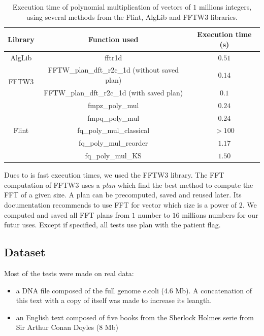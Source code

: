 \documentclass[preprint,12pt]{elsarticle}
\begin{document}
\begin{table}[h]
\label{tempsFFT}
\begin{tabular}{|c|c|c|}
\hline
Library 				& Function used 							& Execution time (s) \\ \hline
AlgLib 					& fftr1d 									& $0.51$ \\ \hline
\multirow{2}{*}{FFTW3} 	& FFTW\_plan\_dft\_r2c\_1d (without saved plan) & $0.14$ \\
						& FFTW\_plan\_dft\_r2c\_1d (with saved plan) 	& $0.1$ \\ \hline
\multirow{5}{*}{Flint} 	& fmpz\_poly\_mul 							& $0.24$ \\
						& fmpq\_poly\_mul 							& $0.24$ \\
						& fq\_poly\_mul\_classical 					& $> 100$ \\
						& fq\_poly\_mul\_reorder 						& $1.17$ \\
						& fq\_poly\_mul\_KS 							& $1.50$ \\ \hline
\end{tabular}
\caption{Execution time of polynomial multiplication of vectors of $1$ millions integers,
using several methods from the Flint, AlgLib and FFTW3 libraries.
}
\end{table}

Dues to is fast execution times, we used the FFTW3 library.
The FFT computation of FFTW3 uses a \textit{plan} which find the best method to compute the FFT of a given size.
A plan can be precomputed, saved and reused later.
Its documentation recommends to use FFT for vector which size is a power of $2$.
We computed and saved all FFT plans from $1$ number to $16$ millions numbers for our futur uses.
Except if specified, all tests use plan with the patient flag.


\subsection*{Dataset}

Most of the tests were made on real data:
\begin{itemize}
\setlength\itemsep{-0.4em}
\item a DNA file composed of the full genome e.coli (4.6 Mb). A concatenation of this text with a copy of itself was made to increase its leangth.
\item an English text composed of five books from the Sherlock Holmes serie from Sir Arthur Conan Doyles (8 Mb)
\end{itemize}
\end{document}

